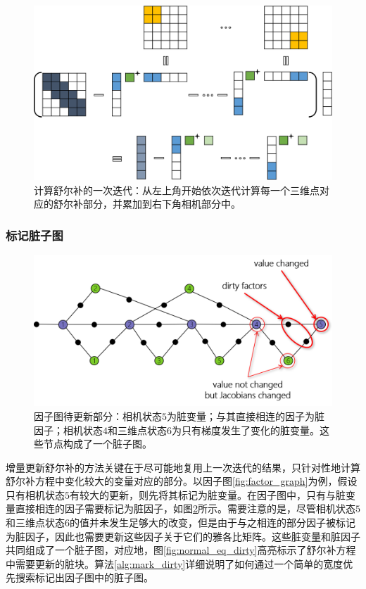\begin{figure}[htb!]
    \centering
    \includegraphics[width=\textwidth]{figs/schur_complement.png}
    \caption{计算舒尔补的一次迭代：从左上角开始依次迭代计算每一个三维点对应的舒尔补部分，并累加到右下角相机部分中。}
    \label{fig:schur_complement}
\end{figure}

\subsubsection{标记脏子图}

\begin{figure}[htb!]
    \centering
    \includegraphics[width=.8\textwidth]{figs/factor_graph_dirty.png}
    \caption{因子图待更新部分：相机状态$5$为脏变量；与其直接相连的因子为脏因子；相机状态$4$和三维点状态$6$为只有梯度发生了变化的脏变量。这些节点构成了一个脏子图。}
    \label{fig:factor_graph_dirty}
\end{figure}

增量更新舒尔补的方法关键在于尽可能地复用上一次迭代的结果，只针对性地计算舒尔补方程中变化较大的变量对应的部分。以因子图\ref{fig:factor_graph}为例，假设只有相机状态$5$有较大的更新，则先将其标记为脏变量。在因子图中，只有与脏变量直接相连的因子需要标记为脏因子，如图\ref{fig:factor_graph_dirty}所示。需要注意的是，尽管相机状态$5$和三维点状态$6$的值并未发生足够大的改变，但是由于与之相连的部分因子被标记为脏因子，因此也需要更新这些因子关于它们的雅各比矩阵。这些脏变量和脏因子共同组成了一个脏子图，对应地，图\ref{fig:normal_eq_dirty}高亮标示了舒尔补方程中需要更新的脏块。算法\ref{alg:mark_dirty}详细说明了如何通过一个简单的宽度优先搜索标记出因子图中的脏子图。

